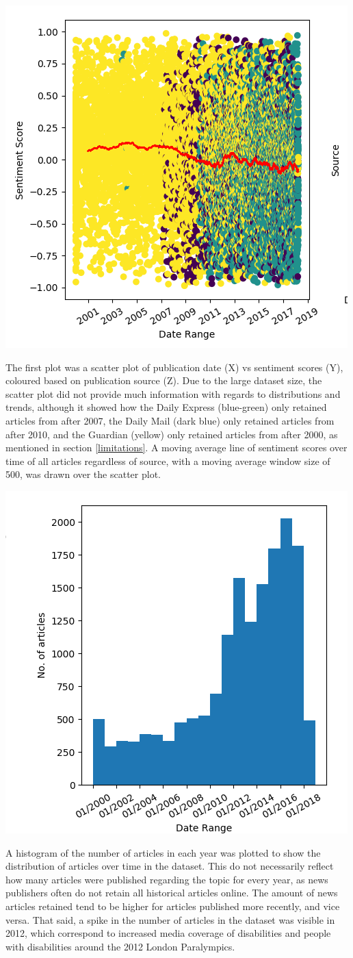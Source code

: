\documentclass{report}
\newcommand{\textapprox}{\raisebox{0.5ex}{\texttildelow}}  %
\begin{document}
\begin{center}
	\includegraphics[height=0.5\linewidth]{row-1-col-1.png}
\end{center}

The first plot was a scatter plot of publication date (X) vs sentiment scores (Y), coloured based on publication source (Z). 
Due to the large dataset size, the scatter plot did not provide much information with regards to distributions and trends, although it showed how the Daily Express (blue-green) only retained articles from after \textapprox2007, the Daily Mail (dark blue) only retained articles from after \textapprox2010, and the Guardian (yellow) only retained articles from after \textapprox2000, as mentioned in section \ref{limitations}.
A moving average line of sentiment scores over time of all articles regardless of source, with a moving average window size of 500, was drawn over the scatter plot.

\begin{center}
	\includegraphics[width=0.5\linewidth]{row-1-col-3.png}
\end{center}

A histogram of the number of articles in each year was plotted to show the distribution of articles over time in the dataset. 
This do not necessarily reflect how many articles were published regarding the topic for every year, as news publishers often do not retain all historical articles online. 
The amount of news articles retained tend to be higher for articles published more recently, and vice versa.
That said, a spike in the number of articles in the dataset was visible in 2012, which correspond to increased media coverage of disabilities and people with disabilities around the 2012 London Paralympics.
\end{document}
